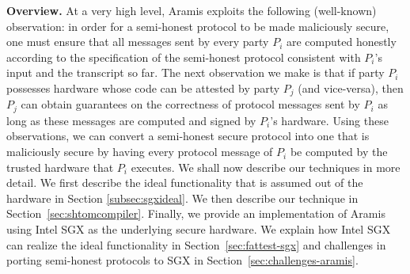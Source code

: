 \noindent\textbf{Overview.} At a very high level, Aramis
exploits the following (well-known) observation: in order for a
semi-honest protocol to be made maliciously secure, one must ensure
that all messages sent by every party $P_i$ are computed honestly
according to the specification of the semi-honest protocol consistent
with $P_i$'s input and the transcript so far.
The next observation we make is that if party $P_i$ possesses hardware
whose code can be attested by party $P_j$ (and vice-versa), then $P_j$
can obtain guarantees on the correctness of protocol messages sent by
$P_i$ as long as these messages are computed and signed by $P_i$'s
hardware.
Using these observations, we can convert a semi-honest secure protocol into one that is maliciously secure by having every protocol message of $P_i$ be computed by the trusted hardware that $P_i$ executes. 
We shall now describe our techniques in more detail. 
We first describe the ideal functionality that is assumed out of the hardware in Section \ref{subsec:sgxideal}. 
We then describe our technique in Section~\ref{sec:shtomcompiler}.
%
Finally, we provide an implementation of Aramis using Intel SGX as the underlying secure hardware. 
We explain how Intel SGX can realize the ideal functionality
in Section~\ref{sec:fattest-sgx} and challenges in porting semi-honest
\mpc protocols to SGX in Section~\ref{sec:challenges-aramis}.

